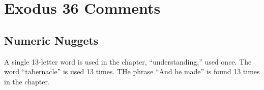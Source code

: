 \section{Exodus 36 Comments}

\subsection{Numeric Nuggets}
A single 13-letter word is used in the chapter, ``understanding,'' used once. The word ``tabernacle'' is used 13 times. THe phrase ``And he made'' is found 13 times in the chapter.

